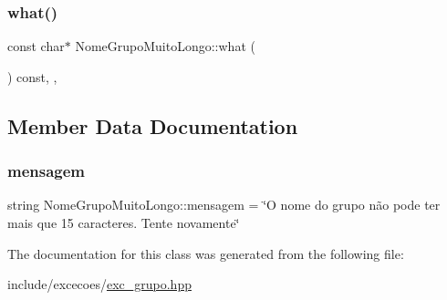 \subsubsection{\texorpdfstring{what()}{what()}}
{\footnotesize\ttfamily const char$\ast$ Nome\+Grupo\+Muito\+Longo\+::what (\begin{DoxyParamCaption}{ }\end{DoxyParamCaption}) const\hspace{0.3cm}{\ttfamily [inline]}, {\ttfamily [override]}, {\ttfamily [noexcept]}}



\subsection{Member Data Documentation}
\mbox{\label{classNomeGrupoMuitoLongo_a41c3c15095f9045cad1563e8f2257bbc}} 
\subsubsection{\texorpdfstring{mensagem}{mensagem}}
{\footnotesize\ttfamily string Nome\+Grupo\+Muito\+Longo\+::mensagem = \char`\"{}O nome do grupo não pode ter mais que 15 caracteres. Tente novamente\char`\"{}\hspace{0.3cm}{\ttfamily [private]}}



The documentation for this class was generated from the following file\+:\begin{DoxyCompactItemize}
\item 
include/excecoes/\hyperlink{exc__grupo_8hpp}{exc\+\_\+grupo.\+hpp}\end{DoxyCompactItemize}
